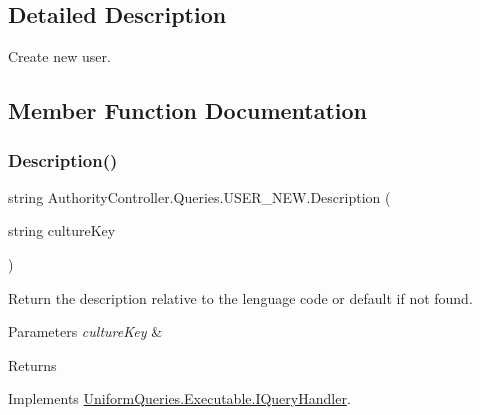 \subsection{Detailed Description}
Create new user. 



\subsection{Member Function Documentation}
\mbox{\label{class_authority_controller_1_1_queries_1_1_u_s_e_r___n_e_w_ab0995d0559e0033ea963acaccb6e37bf}} 
\subsubsection{\texorpdfstring{Description()}{Description()}}
{\footnotesize\ttfamily string Authority\+Controller.\+Queries.\+U\+S\+E\+R\+\_\+\+N\+E\+W.\+Description (\begin{DoxyParamCaption}\item[{string}]{culture\+Key }\end{DoxyParamCaption})}



Return the description relative to the lenguage code or default if not found. 


\begin{DoxyParams}{Parameters}
{\em culture\+Key} & \\
\hline
\end{DoxyParams}
\begin{DoxyReturn}{Returns}

\end{DoxyReturn}


Implements \mbox{\hyperlink{interface_uniform_queries_1_1_executable_1_1_i_query_handler_ae0e55919571d5456af31298394d241a9}{Uniform\+Queries.\+Executable.\+I\+Query\+Handler}}.

\mbox{\label{class_authority_controller_1_1_queries_1_1_u_s_e_r___n_e_w_afd715fb3d60e53ca7e3d55a4433f529c}} 
